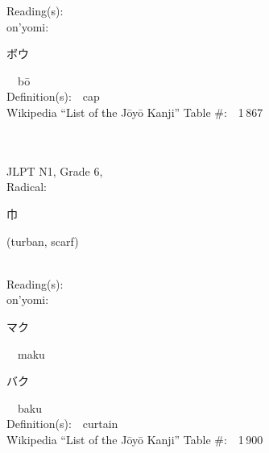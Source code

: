 \begin{multicols}{2}
Reading(s):\ \ \\
{\hspace*{1em}}on'yomi:\ \ \\
{\hspace*{2em}}{\begin{CJK}{UTF8}{min} ボウ \end{CJK}}\ \ b\=o\ \ \\
Definition(s):\ \ cap \\
Wikipedia ``List of the J\=oy\=o Kanji'' Table \#:\ \ 1\,867 \\
\ \ \\
{\fontsize{34pt}{40pt}  }\ \ \\  %
{JLPT N1, Grade 6, \\Radical:\ \ {\begin{CJK}{UTF8}{min} 巾 \end{CJK}} (turban, scarf) } \\
Reading(s):\ \ \\
{\hspace*{1em}}on'yomi:\ \ \\
{\hspace*{2em}}{\begin{CJK}{UTF8}{min} マク \end{CJK}}\ \ maku\ \ \\
{\hspace*{2em}}{\begin{CJK}{UTF8}{min} バク \end{CJK}}\ \ baku\ \ \\
Definition(s):\ \ curtain \\
Wikipedia ``List of the J\=oy\=o Kanji'' Table \#:\ \ 1\,900 \\
\ \ \\
\end{multicols}



\newpage



